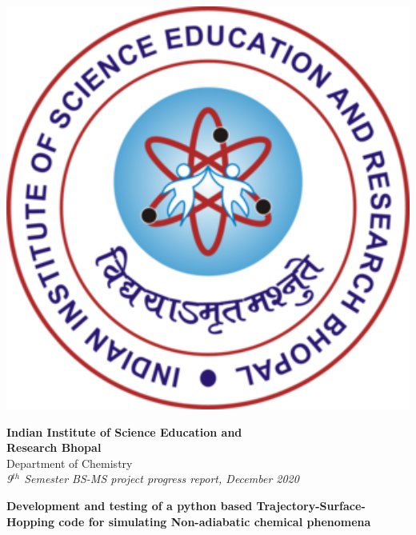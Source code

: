 \documentclass[12pt]{article}
\begin{document}
\begin{titlepage}
 
\begin{minipage}[c]{0.2\linewidth}
\includegraphics[width=1.0\textwidth]{iiserb_logo.png}
\end{minipage} %
\begin{minipage}[c]{0.8\linewidth}
\begin{center}
\begin{Large}
\textbf{Indian Institute of Science Education and \\ \vspace*{-1mm}Research Bhopal}\\ \vspace*{-1mm}
Department of Chemistry\\ \vspace{1mm}
\large{\textit{9$^{th}$ Semester BS-MS project progress report, December 2020}}
\end{Large}
\end{center}
\end{minipage}  
\vspace{3mm}
\begin{center}
\begin{Large}
\textbf{Development and testing of a python based Trajectory-Surface-Hopping code for simulating Non-adiabatic chemical phenomena}
\end{Large}
\end{center}
\vspace{3mm}


\end{titlepage}
\end{document}
